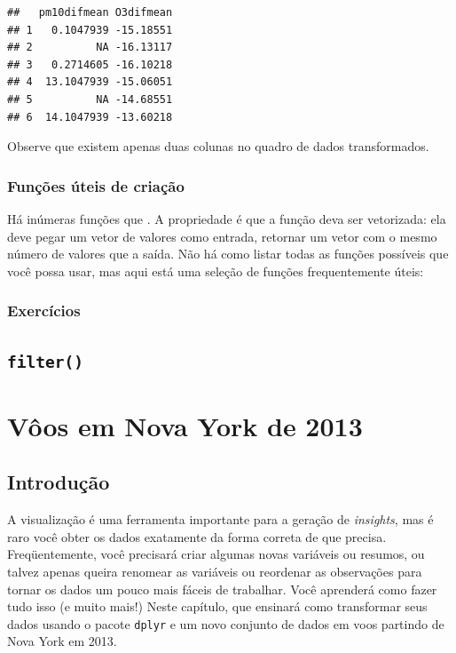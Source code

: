 \documentclass[]{book}
\begin{document}
\begin{verbatim}
##   pm10difmean O3difmean
## 1   0.1047939 -15.18551
## 2          NA -16.13117
## 3   0.2714605 -16.10218
## 4  13.1047939 -15.06051
## 5          NA -14.68551
## 6  14.1047939 -13.60218
\end{verbatim}

Observe que existem apenas duas colunas no quadro de dados transformados.

\hypertarget{funuxe7uxf5es-uxfateis-de-criauxe7uxe3o}{%
\subsection{Funções úteis de criação}\label{funuxe7uxf5es-uxfateis-de-criauxe7uxe3o}}

Há inúmeras funções que . A propriedade é que a função deva ser vetorizada: ela deve pegar um vetor de valores como entrada, retornar um vetor com o mesmo número de valores que a saída. Não há como listar todas as funções possíveis que você possa usar, mas aqui está uma seleção de funções frequentemente úteis:

\hypertarget{exercuxedcios-2}{%
\subsection{Exercícios}\label{exercuxedcios-2}}

\hypertarget{filter}{%
\section{\texorpdfstring{\texttt{filter()}}{filter()}}\label{filter}}

\hypertarget{application}{%
\chapter{Vôos em Nova York de 2013}\label{application}}

\hypertarget{introduuxe7uxe3o}{%
\section{Introdução}\label{introduuxe7uxe3o}}

A visualização é uma ferramenta importante para a geração de \emph{insights}, mas é raro você obter os dados exatamente da forma correta de que precisa. Freqüentemente, você precisará criar algumas novas variáveis ou resumos, ou talvez apenas queira renomear as variáveis ou reordenar as observações para tornar os dados um pouco mais fáceis de trabalhar. Você aprenderá como fazer tudo isso (e muito mais!) Neste capítulo, que ensinará como transformar seus dados usando o pacote \texttt{dplyr} e um novo conjunto de dados em voos partindo de Nova York em 2013.
\end{document}
